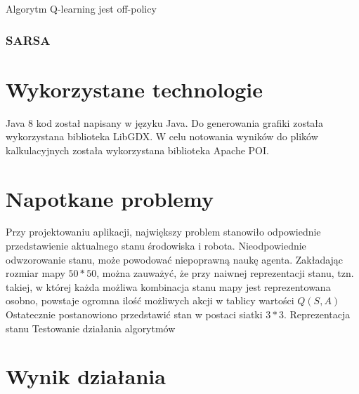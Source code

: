 Algorytm Q-learning \cite{watkins1992q} jest off-policy

\subsubsection{SARSA}
\label{subsubsec:sarsa}

\section{Wykorzystane technologie}
\label{sec:wykorzystanetechnologie}

Java 8 kod został napisany w języku Java. Do generowania grafiki została wykorzystana biblioteka LibGDX. W celu notowania wyników do plików kalkulacyjnych została wykorzystana biblioteka Apache POI.

\section{Napotkane problemy}
\label{sec:napotkaneproblemy}

Przy projektowaniu aplikacji, największy problem stanowiło odpowiednie przedstawienie aktualnego stanu środowiska i robota. Nieodpowiednie odwzorowanie stanu, może powodować niepoprawną naukę agenta.
Zakładając rozmiar mapy $50*50$, można zauważyć, że przy naiwnej reprezentacji stanu, tzn. takiej, w której każda możliwa kombinacja stanu mapy jest reprezentowana osobno, powstaje ogromna ilość możliwych akcji w tablicy wartości $Q(S,A)$ 
Ostatecznie postanowiono przedstawić stan w postaci siatki $3*3$.
Reprezentacja stanu
Testowanie działania algorytmów

\section{Wynik działania}
\label{sec:wynikdzialania}
















